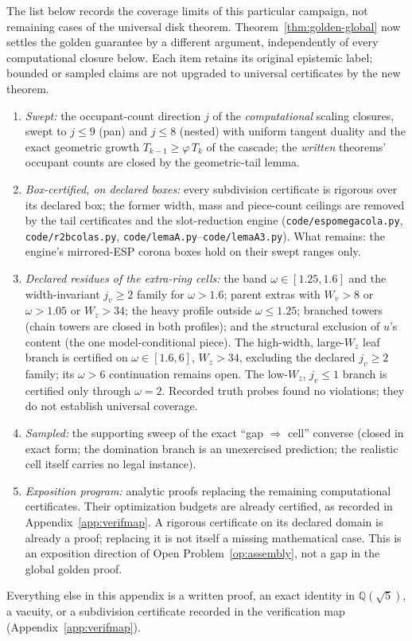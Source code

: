 \documentclass[11pt]{article}
\theoremstyle{definition}
\begin{document}
The list below records the coverage limits of this particular campaign,
not remaining cases of the universal disk theorem.
Theorem~\ref{thm:golden-global} now settles the golden guarantee by a
different argument, independently of every computational closure below.
Each item retains its original epistemic label; bounded or sampled
claims are not upgraded to universal certificates by the new theorem.
\begin{enumerate}
\item[(i)] \emph{Swept:} the occupant-count direction $j$ of the
\emph{computational} scaling closures, swept to $j\le9$ (pan) and
$j\le8$ (nested) with uniform tangent duality and the exact
geometric growth $T_{k-1}\ge\varphi\,T_k$ of the cascade; the
\emph{written} theorems' occupant counts are closed by the
geometric-tail lemma.
\item[(ii)] \emph{Box-certified, on declared boxes:} every
subdivision certificate is rigorous over its declared box; the
former width, mass and piece-count ceilings are removed by the
tail certificates and the slot-reduction engine
(\texttt{code/espomegacola.py}, \texttt{code/r2bcolas.py},
\texttt{code/lemaA.py}--\texttt{code/lemaA3.py}). What remains:
the engine's mirrored-ESP corona boxes hold on their swept ranges
only.
\item[(iii)] \emph{Declared residues of the extra-ring cells:}
the band $\omega\in[1.25,1.6]$ and the width-invariant
$j_v\ge2$ family for $\omega>1.6$; parent extras with $W_v>8$ or
$\omega>1.05$ or $W_z>34$; the heavy profile outside
$\omega\le1.25$; branched towers (chain towers are closed in
both profiles); and the structural exclusion of $u$'s content (the
one model-conditional piece). The high-width, large-$W_z$ leaf
branch is certified on $\omega\in[1.6,6]$, $W_z>34$, excluding
the declared $j_v\ge2$ family; its $\omega>6$ continuation remains
open. The low-$W_z$, $j_v\le1$ branch is certified only through
$\omega=2$. Recorded truth probes found no violations; they do
not establish universal coverage.
\item[(iv)] \emph{Sampled:} the supporting sweep of the exact
``gap $\Rightarrow$ cell'' converse (closed in exact form;
the domination branch is an unexercised prediction; the realistic
cell itself carries no legal instance).
\item[(v)] \emph{Exposition program:} analytic proofs replacing the
remaining computational certificates. Their optimization budgets
are already certified, as recorded in Appendix~\ref{app:verifmap}.
A rigorous certificate on its
declared domain is already a proof; replacing it is not itself a
missing mathematical case. This is an exposition direction of Open
Problem~\ref{op:assembly}, not a gap in the global golden proof.
\end{enumerate}
Everything else in this appendix is a written proof, an exact
identity in $\mathbb{Q}(\sqrt5)$, a vacuity, or a subdivision
certificate recorded in the verification map
(Appendix~\ref{app:verifmap}).
\end{document}
